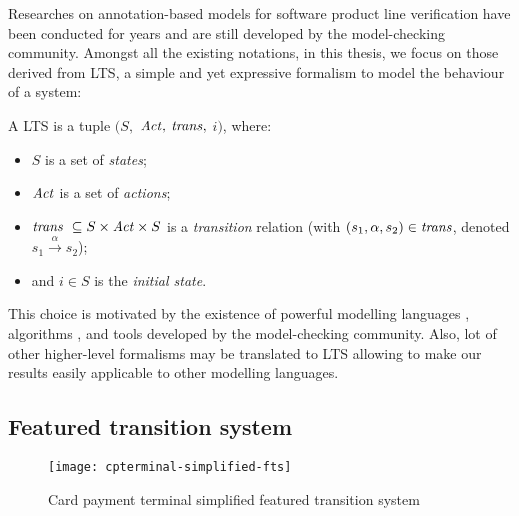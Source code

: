 
Researches on annotation-based models for software product line verification have been conducted for years and are still developed by the model-checking community. Amongst all the existing notations, in this thesis, we focus on those derived from \gls{LTS}, a simple and yet expressive formalism to model the behaviour of a system:
%
\begin{definition} \label{def:ts}
A LTS is a tuple $(S,$ $\mathit{Act},$ $\mathit{trans},$ $i)$, where:
\begin{itemize}
\item $S$ is a set of \emph{states};
\item $\mathit{Act}$ is a set of \emph{actions};
\item $\mathit{trans} \ \subseteq S \times \mathit{Act} \times S$ is a \emph{transition} relation (with $(s_1, \alpha, s_2) \in \mathit{trans}$, denoted $s_1 \overset{\alpha}{\longrightarrow} s_2$);
\item and $i \in S$ is the \emph{initial state}.
\end{itemize}
\end{definition} 
%
This choice is motivated by the existence of powerful modelling languages \cite{Asirelli2011a,Fantechi2008,TerBeek2013}, algorithms \cite{Classen2010,Classen2013b}, and tools \cite{Asirelli2011b,Cordy2013} developed by the model-checking community. Also, lot of other higher-level formalisms may be translated to \gls{LTS} \cite{Devroey2015c} allowing to make our results easily applicable to other modelling  languages.

\subsection{Featured transition system}

\begin{figure}[t]
	\centering
	\texttt{[image: cpterminal-simplified-fts]}
	\caption{Card payment terminal simplified \gls{featured transition system}}
	\label{fig:cpterminalsimplifiedfts}
\end{figure}


